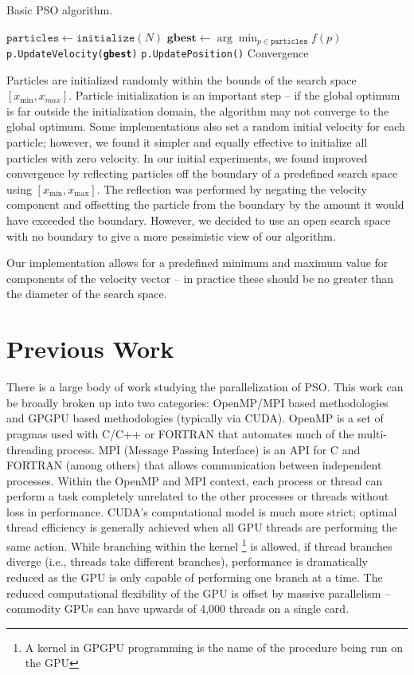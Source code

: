 \begin{algorithm}
  \caption{Basic PSO algorithm.}\label{alg:pso}
  \begin{algorithmic}[1]
    \State $\texttt{particles} \gets \texttt{initialize}(N)$
    \Repeat
    \State $\textbf{gbest} \gets \arg\min_{p\in\texttt{particles}}f(p)$
    \State \texttt{p.UpdateVelocity(\textbf{gbest})}
    \State \texttt{p.UpdatePosition()}
    \EndFor
    \Until Convergence
    \EndProcedure
  \end{algorithmic}
\end{algorithm}

Particles are initialized randomly within the bounds of the search space
$[x_{\min}, x_{max}]$. Particle initialization is an important
step -- if the global optimum is far outside the initialization domain, the
algorithm may not converge to the global optimum.
Some implementations also set a random
initial velocity for each particle; however, we found it simpler and equally
effective to initialize all particles with zero velocity. In our initial
experiments, we found improved convergence by reflecting particles off the
boundary of a predefined search space using $[x_{\min}, x_{\max}]$. The
reflection was performed by negating the velocity component and offsetting the
particle from the boundary by the amount it would have exceeded the boundary.
However, we decided to use an open search space with no boundary to give a more
pessimistic view of our algorithm.

Our implementation allows for a predefined minimum and maximum value for
components of the velocity vector -- in practice these should be no greater than
the diameter of the search space.

\section{Previous Work}\label{sec:prior}
There is a large body of work studying the parallelization of PSO. This work can
be broadly broken up into two categories: OpenMP/MPI based methodologies and
GPGPU based methodologies (typically via CUDA). OpenMP is a set of pragmas used
with C/C++ or FORTRAN that automates much of the multi-threading process. MPI
(Message Passing Interface) is an API for C and FORTRAN (among others) that
allows communication between independent processes. Within the OpenMP and MPI
context, each process or thread can perform a task completely unrelated to the
other processes or threads without loss in performance. CUDA's computational
model is much more strict; optimal thread efficiency is generally achieved when
all GPU threads are performing the same action. While branching within the
kernel
\footnote{A kernel in GPGPU programming is the name of the procedure being run on  the GPU}
is allowed, if thread branches diverge (i.e., threads take different
branches), performance is dramatically reduced as the GPU is only capable of
performing one branch at a time. The reduced computational flexibility of the
GPU is offset by massive parallelism -- commodity GPUs can have upwards of 4,000
threads on a single card.

